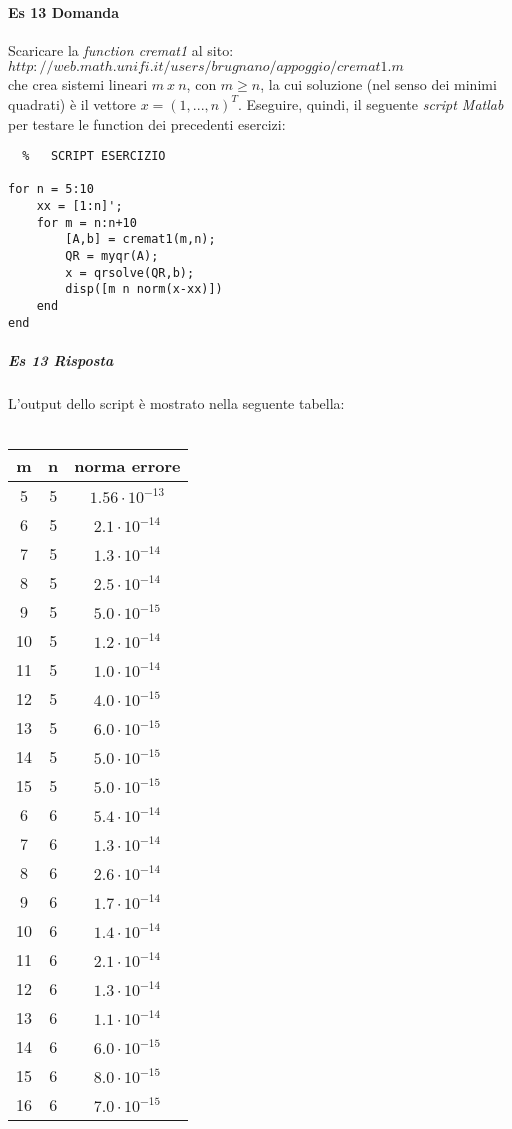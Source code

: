 \documentclass[a4paper]{report}
\begin{document}
\paragraph{Es 13 Domanda}
Scaricare la \emph{function cremat1} al sito: \\$http://web.math.unifi.it/users/brugnano/appoggio/cremat1.m$\\ che crea sistemi lineari $m\ x\ n$, con $m \geq n$, la cui soluzione (nel senso dei minimi quadrati) è il vettore $x=(1,...,n)^T$. Eseguire, quindi, il seguente \emph{script Matlab} per testare le function dei precedenti esercizi:
\begin{lstlisting}	%	SCRIPT ESERCIZIO

for n = 5:10
	xx = [1:n]';
	for m = n:n+10
		[A,b] = cremat1(m,n);
		QR = myqr(A);
		x = qrsolve(QR,b);
		disp([m n norm(x-xx)])
	end
end
\end{lstlisting}
\subparagraph{Es 13 Risposta}
L'output dello script è mostrato nella seguente tabella:\\\\
\begin{tabular}{|c|c|c|}
\hline
m&n&norma errore\\ \hline
5& 5&$1.56\cdot10^{-13}$\\ \hline
6& 5&$2.1\cdot10^{-14}$\\ \hline
7& 5&$1.3\cdot10^{-14}$\\ \hline
8& 5&$2.5\cdot10^{-14}$\\ \hline
 9& 5&$5.0 \cdot 10^{-15}$\\ \hline
10& 5&$1.2\cdot 10^{-14}$\\ \hline
11& 5&$1.0\cdot 10^{-14}$\\ \hline
12& 5&$4.0\cdot 10^{-15}$\\ \hline
13& 5&$6.0\cdot 10^{-15}$\\ \hline
14& 5&$5.0\cdot 10^{-15}$\\ \hline
15& 5&$5.0\cdot 10^{-15}$\\ \hline
6& 6&$5.4\cdot 10^{-14}$\\ \hline
7& 6&$1.3\cdot 10^{-14}$\\ \hline
8& 6&$2.6\cdot 10^{-14}$\\ \hline
9& 6&$1.7\cdot 10^{-14}$\\ \hline
10& 6&$1.4\cdot 10^{-14}$\\ \hline
11& 6&$2.1\cdot 10^{-14}$\\ \hline
12& 6&$1.3\cdot 10^{-14}$\\ \hline
13& 6&$1.1\cdot 10^{-14}$\\ \hline
14& 6&$6.0\cdot 10^{-15}$\\ \hline
15& 6&$8.0\cdot 10^{-15}$\\ \hline
16& 6&$7.0\cdot 10^{-15}$\\ \hline
\end{tabular}
\end{document}
